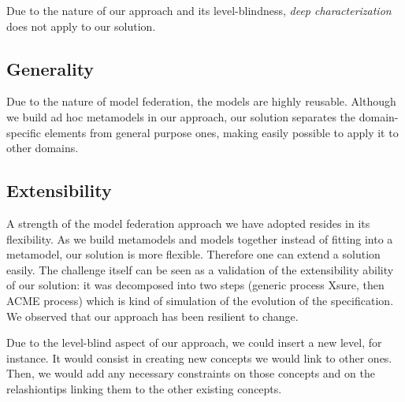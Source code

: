   Due to the nature of our approach and its level-blindness, \emph{deep characterization} does not apply to our solution. 
  
  

  \subsection{Generality}


  Due to the nature of model federation, the models are highly reusable.
  Although we build ad hoc metamodels in our approach, our solution separates
  the domain-specific elements from general purpose ones, making easily
  possible to apply it to other domains. 

  \subsection{Extensibility}


  A strength of the  model federation approach we have adopted resides in its
  flexibility. As we build metamodels and models together instead of fitting
  into a metamodel, our solution is more flexible. Therefore one can extend a
  solution easily. The challenge itself can be seen as a validation of the
  extensibility ability of our solution: it was decomposed into two steps
  (generic process Xsure, then ACME process) which is kind of simulation of the
  evolution of the  specification. We observed that our approach has been
  resilient to change.

  Due to the level-blind aspect of our approach, we could insert a new level,
  for instance. It would consist in creating new concepts we would link to
  other ones. Then, we would add any necessary constraints on those concepts
  and on the relashiontips linking them to the other existing concepts. 

